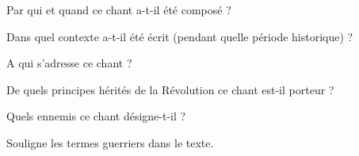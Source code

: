 \documentclass[a4paper,12pt]{exam}
\newcommand{\rep}[1]{}
\newcommand{\rep}[1]{\fillwithdottedlines{#1}}
\begin{document}
\begin{questions}
\question[1] Par qui et quand ce chant a-t-il été composé ? 
  \rep{2cm}
  
  \question[1] Dans quel contexte a-t-il été écrit (pendant quelle période historique) ?
    \rep{2cm}
  
\question[1] A qui s'adresse ce chant ?
  \rep{2cm}
  
\question[1] De quels principes hérités de la Révolution ce chant est-il porteur ?
  \rep{2cm}
  
\question[1] Quels ennemis ce chant désigne-t-il ?
  \rep{1cm}
  
\question[1] Souligne les termes guerriers dans le texte.
  
  
 \end{questions}
\end{document}
